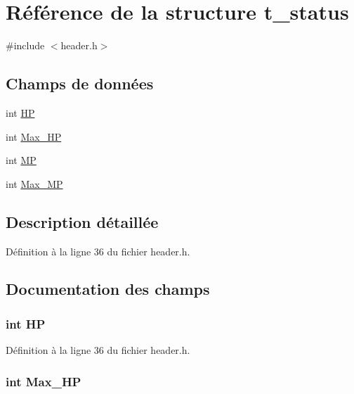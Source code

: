 \hypertarget{structt__status}{\section{Référence de la structure t\-\_\-status}
\label{structt__status}
}


{\ttfamily \#include $<$header.\-h$>$}

\subsection*{Champs de données}
\begin{DoxyCompactItemize}
\item 
int \hyperlink{structt__status_a58ca25ca6c9448a364b84539e42f1fa6}{H\-P}
\item 
int \hyperlink{structt__status_a3ae8966f5c827b3c74072acda8de72af}{Max\-\_\-\-H\-P}
\item 
int \hyperlink{structt__status_a30fc75b90111fc791752dd1add6ed991}{M\-P}
\item 
int \hyperlink{structt__status_a5e48a681ff3d92aaa0e643fbc32ab2f7}{Max\-\_\-\-M\-P}
\end{DoxyCompactItemize}


\subsection{Description détaillée}


Définition à la ligne 36 du fichier header.\-h.



\subsection{Documentation des champs}
\hypertarget{structt__status_a58ca25ca6c9448a364b84539e42f1fa6}{
\subsubsection[{H\-P}]{\setlength{\rightskip}{0pt plus 5cm}int H\-P}}\label{structt__status_a58ca25ca6c9448a364b84539e42f1fa6}


Définition à la ligne 36 du fichier header.\-h.

\hypertarget{structt__status_a3ae8966f5c827b3c74072acda8de72af}{
\subsubsection[{Max\-\_\-\-H\-P}]{\setlength{\rightskip}{0pt plus 5cm}int Max\-\_\-\-H\-P}}\label{structt__status_a3ae8966f5c827b3c74072acda8de72af}


